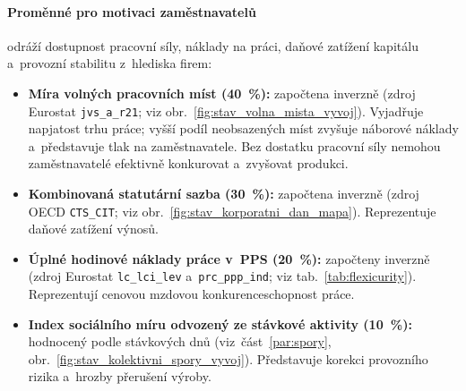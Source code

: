 \paragraph{Proměnné pro motivaci zaměstnavatelů}
odráží dostupnost pracovní síly, náklady na práci, daňové zatížení kapitálu a~provozní stabilitu z~hlediska firem:
\begin{itemize}[noitemsep]
  \item \textbf{Míra volných pracovních míst (\SI{40}{\percent}):} započtena inverzně (zdroj Eurostat \texttt{jvs\_a\_r21}; viz obr.~\ref{fig:stav_volna_mista_vyvoj}). Vyjadřuje napjatost trhu práce; vyšší podíl neobsazených míst zvyšuje náborové náklady a~představuje tlak na zaměstnavatele. Bez dostatku pracovní síly nemohou zaměstnavatelé efektivně konkurovat a~zvyšovat produkci.
  \item \textbf{Kombinovaná statutární sazba  (\SI{30}{\percent}):} započtena inverzně (zdroj \acs{OECD} \texttt{CTS\_CIT}; viz obr.~\ref{fig:stav_korporatni_dan_mapa}). Reprezentuje daňové zatížení výnosů.
  \item \textbf{Úplné hodinové náklady práce v~\acs{PPS} (\SI{20}{\percent}):} započteny inverzně (zdroj Eurostat \texttt{lc\_lci\_lev} a~\texttt{prc\_ppp\_ind}; viz tab.~\ref{tab:flexicurity}). Reprezentují cenovou mzdovou konkurenceschopnost práce.
  \item \textbf{Index sociálního míru odvozený ze stávkové aktivity (\SI{10}{\percent}):} hodnocený podle stávkových dnů (viz~část~\ref{par:spory}, obr.~\ref{fig:stav_kolektivni_spory_vyvoj}). Představuje korekci provozního rizika a~hrozby přerušení výroby.
\end{itemize}

